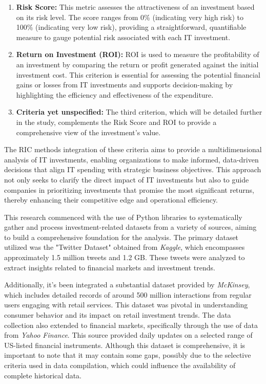 \documentclass[
]{article}
\begin{document}
\begin{enumerate}
\def\labelenumi{\arabic{enumi}.}
\item
  \textbf{Risk Score:} This metric assesses the attractiveness of an
  investment based on its risk level. The score ranges from 0\%
  (indicating very high risk) to 100\% (indicating very low risk),
  providing a straightforward, quantifiable measure to gauge potential
  risk associated with each IT investment.
\item
  \textbf{Return on Investment (ROI):} ROI is used to measure the
  profitability of an investment by comparing the return or profit
  generated against the initial investment cost. This criterion is
  essential for assessing the potential financial gains or losses from
  IT investments and supports decision-making by highlighting the
  efficiency and effectiveness of the expenditure.
\item
  \textbf{Criteria yet unspecified:} The third criterion, which will be
  detailed further in the study, complements the Risk Score and ROI to
  provide a comprehensive view of the investment's value.
\end{enumerate}

The RIC method\textquotesingle s integration of these criteria aims to
provide a multidimensional analysis of IT investments, enabling
organizations to make informed, data-driven decisions that align IT
spending with strategic business objectives. This approach not only
seeks to clarify the direct impact of IT investments but also to guide
companies in prioritizing investments that promise the most significant
returns, thereby enhancing their competitive edge and operational
efficiency.

This research commenced with the use of Python libraries to
systematically gather and process investment-related datasets from a
variety of sources, aiming to build a comprehensive foundation for the
analysis. The primary dataset utilized was the "Twitter Dataset"
obtained from \emph{Kaggle}, which encompasses approximately 1.5 million
tweets and 1.2 GB. These tweets were analyzed to extract insights
related to financial markets and investment trends.

Additionally, it's been integrated a substantial dataset provided by
\emph{McKinsey}, which includes detailed records of around 500 million
interactions from regular users engaging with retail services. This
dataset was pivotal in understanding consumer behavior and its impact on
retail investment trends. The data collection also extended to financial
markets, specifically through the use of data from \emph{Yahoo Finance}.
This source provided daily updates on a selected range of US-listed
financial instruments. Although this dataset is comprehensive, it is
important to note that it may contain some gaps, possibly due to the
selective criteria used in data compilation, which could influence the
availability of complete historical data.
\end{document}
